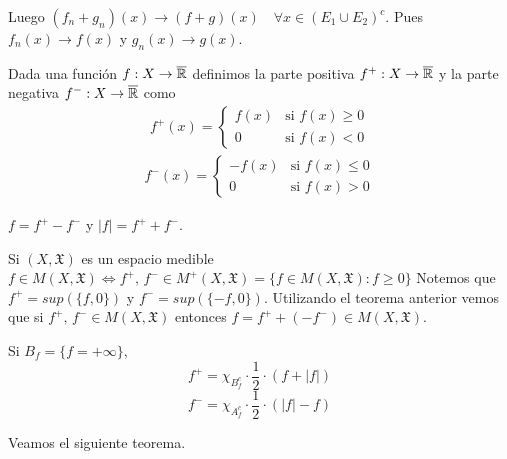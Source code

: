Luego $(f_n + g_n)(x) \to (f+g)(x) \quad \forall x \in (E_1 \cup E_2)^c$. Pues $f_n(x) \to f(x)$ y $g_n(x) \to g(x)$.

\clearpage

\begin{definition}
    Dada una función $f : X \to \overline{\mathbb{R}}$ definimos la parte positiva $f^{+} : X \to \overline{\mathbb{R}}$ y la parte negativa $f^{-} : X \to \overline{\mathbb{R}}$ como
    \begin{align*}
        f^{+}(x) = \begin{cases}
                       f(x) & \text{si } f(x) \geq 0 \\
                       0    & \text{si } f(x) < 0
                   \end{cases}
    \end{align*}
    \begin{align*}
        f^{-}(x) = \begin{cases}
                       -f(x) & \text{si } f(x) \leq 0 \\
                       0     & \text{si } f(x) > 0
                   \end{cases}
    \end{align*}
\end{definition}

\begin{note}
    $f = f^{+} - f^{-}$ y $|f| = f^{+} + f^{-}$.
\end{note}

\begin{note}
    Si $(X, \mathfrak{X})$ es un espacio medible $f \in M(X, \mathfrak{X}) \iff f^{+} \text{, } f^{-} \in M^{+}(X, \mathfrak{X}) = \{ f \in M(X, \mathfrak{X}) : f \geq 0 \}$
    Notemos que $f^{+} = sup(\{ f, 0 \})$ y $f^{-} = sup(\{ -f, 0 \})$.
    Utilizando el teorema anterior vemos que si $f^{+} \text{, } f^{-} \in M(X, \mathfrak{X})$ entonces $f = f^{+} + (-f^{-}) \in M(X, \mathfrak{X})$.
\end{note}

\begin{note}
    Si $B_f = \{ f = +\infty \}$,
    \[ f^+ = \chi_{B_f^c} \cdot \frac{1}{2} \cdot (f + |f|) \]
    \[ f^- = \chi_{A_f^c} \cdot \frac{1}{2} \cdot (|f| - f) \]
\end{note}

\clearpage

Veamos el siguiente teorema.

